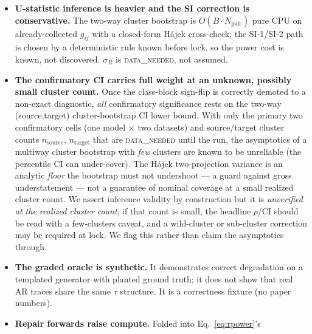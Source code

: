 \documentclass[11pt]{article}
\theoremstyle{plain}
\theoremstyle{definition}
\newcommand{\Rhat}{\widehat{R}}
\newcommand{\Pij}{\Pi_j}
\newcommand{\dpos}{\Delta_{\mathrm{pos}}}
\newcommand{\sR}{\sigma_{R}}
\begin{document}
\begin{itemize}[leftmargin=1.4em,itemsep=2pt]
  $\dpos$ proximity grid and exact budget $k$ that define the matched-null pool
  $\Pij$, so PROPOSED and its B4 control are matched precisely on the structural
  covariates $\Rhat$ subtracts. This (a) tightens the ``self-defined ruler'' critique
  --- the contrast is sharp but narrow --- and (b) risks low positivity, an empirical
  unknown that could route many classes to ``insufficient positivity'' and silently
  shrink the certifiable population, capping power and external validity. We report A7
  per class rather than assuming it, but the certifiable population size is genuinely
  unknown pre-data.
  \item \textbf{U-statistic inference is heavier and the SI correction is
  conservative.} The two-way cluster bootstrap is $O(B\cdot N_{\mathrm{pair}})$ pure
  CPU on already-collected $g_{ij}$ with a closed-form H\'ajek cross-check; the
  SI-1/SI-2 path is chosen by a deterministic rule known before lock, so the power
  cost is known, not discovered. $\sR$ is \textsc{data\_needed}, not assumed.
  \item \textbf{The confirmatory CI carries full weight at an unknown, possibly small
  cluster count.} Once the class-block sign-flip is correctly demoted to a non-exact
  diagnostic, \emph{all} confirmatory significance rests on the two-way (source,target)
  cluster-bootstrap CI lower bound. With only the primary two confirmatory cells (one
  model $\times$ two datasets) and source/target cluster counts $n_{\mathrm{source}}$,
  $n_{\mathrm{target}}$ that are \textsc{data\_needed} until the run, the asymptotics of
  a multiway cluster bootstrap with \emph{few} clusters are known to be unreliable
  (the percentile CI can under-cover). The H\'ajek two-projection variance is an
  analytic \emph{floor} the bootstrap must not undershoot --- a guard against gross
  understatement --- not a guarantee of nominal coverage at a small realized cluster
  count. We assert inference validity by construction but it is \emph{unverified at the
  realized cluster count}; if that count is small, the headline $p$/CI should be read
  with a few-clusters caveat, and a wild-cluster or sub-cluster correction may be
  required at lock. We flag this rather than claim the asymptotics through.
  \item \textbf{The graded oracle is synthetic.} It demonstrates correct degradation
  on a templated generator with planted ground truth; it does not show that real AR
  traces share the same $\tau$ structure. It is a correctness fixture (no paper
  numbers).
  \item \textbf{Repair forwards raise compute.} Folded into Eq.~\ref{eq:rpower}'s

\end{itemize}
\end{document}
